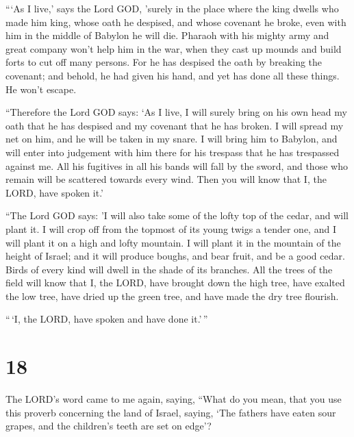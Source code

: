  ```As I live,' says the Lord GOD, 'surely in the place
where the king dwells who made him king, whose oath he despised, and
whose covenant he broke, even with him in the middle of Babylon he will
die.  Pharaoh with his mighty army and great company won't
help him in the war, when they cast up mounds and build forts to cut off
many persons.  For he has despised the oath by breaking the
covenant; and behold, he had given his hand, and yet has done all these
things. He won't escape.

 ``Therefore the Lord GOD says: `As I live, I will surely
bring on his own head my oath that he has despised and my covenant that
he has broken.  I will spread my net on him, and he will be
taken in my snare. I will bring him to Babylon, and will enter into
judgement with him there for his trespass that he has trespassed against
me.  All his fugitives in all his bands will fall by the
sword, and those who remain will be scattered towards every wind. Then
you will know that I, the LORD, have spoken it.'

 ``The Lord GOD says: 'I will also take some of the lofty
top of the cedar, and will plant it. I will crop off from the topmost of
its young twigs a tender one, and I will plant it on a high and lofty
mountain.  I will plant it in the mountain of the height of
Israel; and it will produce boughs, and bear fruit, and be a good cedar.
Birds of every kind will dwell in the shade of its branches.
 All the trees of the field will know that I, the LORD,
have brought down the high tree, have exalted the low tree, have dried
up the green tree, and have made the dry tree flourish.

``\,`I, the LORD, have spoken and have done it.'\,''

\hypertarget{section-16}{%
\section{18}\label{section-16}}

 The LORD's word came to me again, saying, 
``What do you mean, that you use this proverb concerning the land of
Israel, saying, `The fathers have eaten sour grapes, and the children's
teeth are set on edge'?

